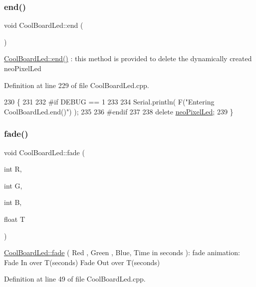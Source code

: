\subsubsection{\texorpdfstring{end()}{end()}}
{\footnotesize\ttfamily void Cool\+Board\+Led\+::end (\begin{DoxyParamCaption}{ }\end{DoxyParamCaption})}

\hyperlink{class_cool_board_led_a69f323359e0c9f797422f2152b5d41ef}{Cool\+Board\+Led\+::end()} \+: this method is provided to delete the dynamically created neo\+Pixel\+Led 

Definition at line 229 of file Cool\+Board\+Led.\+cpp.


\begin{DoxyCode}
230 \{
231 
232 \textcolor{preprocessor}{#if DEBUG == 1 }
233     
234     Serial.println( F(\textcolor{stringliteral}{"Entering CoolBoardLed.end()"}) );
235 
236 \textcolor{preprocessor}{#endif}
237 
238     \textcolor{keyword}{delete} \hyperlink{class_cool_board_led_ac2c13fa462a010cd9242bf297c013923}{neoPixelLed};
239 \}
\end{DoxyCode}
\mbox{\label{class_cool_board_led_af1cacbaa88db8bcf6042c1083ba41155}} 
\subsubsection{\texorpdfstring{fade()}{fade()}}
{\footnotesize\ttfamily void Cool\+Board\+Led\+::fade (\begin{DoxyParamCaption}\item[{int}]{R,  }\item[{int}]{G,  }\item[{int}]{B,  }\item[{float}]{T }\end{DoxyParamCaption})}

\hyperlink{class_cool_board_led_af1cacbaa88db8bcf6042c1083ba41155}{Cool\+Board\+Led\+::fade} ( Red , Green , Blue, Time in seconds )\+: fade animation\+: Fade In over T(seconds) Fade Out over T(seconds) 

Definition at line 49 of file Cool\+Board\+Led.\+cpp.


